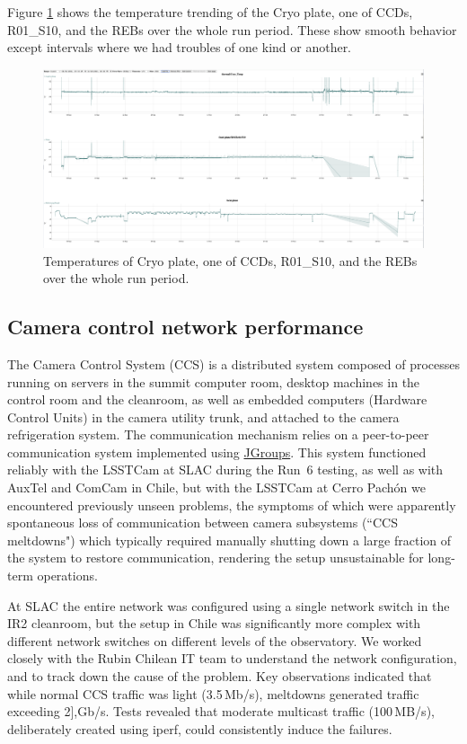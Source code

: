 Figure \ref{fig:tempsoverthewholeperiod} shows the temperature trending of the Cryo plate, one of CCDs, R01\_S10, and the REBs over the whole run period. These show smooth behavior except intervals where we had troubles of one kind or another.
\begin{figure}
    \centering
    \includegraphics[width=1.0\linewidth]{figures/Issues/LSSTCam_Temps_Run7.png}
    \caption{Temperatures of Cryo plate, one of CCDs, R01\_S10, and the REBs over the whole run period.}
    \label{fig:tempsoverthewholeperiod}
\end{figure}

\clearpage
\subsection{Camera control network performance}\label{sec:ccsmeltdown}

The Camera Control System (CCS) is a distributed system composed of processes running on servers in the summit computer room, desktop machines in the control room and the cleanroom, as well as embedded computers (Hardware Control Units) in the camera utility trunk, and attached to the camera refrigeration system. The communication mechanism relies on a peer-to-peer communication system implemented using \href{http://jgroups.org/}{JGroups}. This system functioned reliably with the LSSTCam at SLAC during the Run~6 testing, as well as with AuxTel and ComCam in Chile, but with the LSSTCam at Cerro Pachón we encountered previously unseen problems, the symptoms of which were apparently spontaneous loss of communication between camera subsystems (``CCS meltdowns") which typically required manually shutting down a large fraction of the system to restore communication, rendering the setup unsustainable for long-term operations.

At SLAC the entire network was configured using a single network switch in the IR2 cleanroom, but the setup in Chile was significantly more complex with different network switches on different levels of the observatory. We worked closely with the Rubin Chilean IT team to understand the network configuration, and to track down the cause of the problem. Key observations indicated that while normal CCS traffic was light (3.5\,Mb/s), meltdowns generated traffic exceeding 2],Gb/s. Tests revealed that moderate multicast traffic (100\,MB/s), deliberately created using iperf, could consistently induce the failures.

